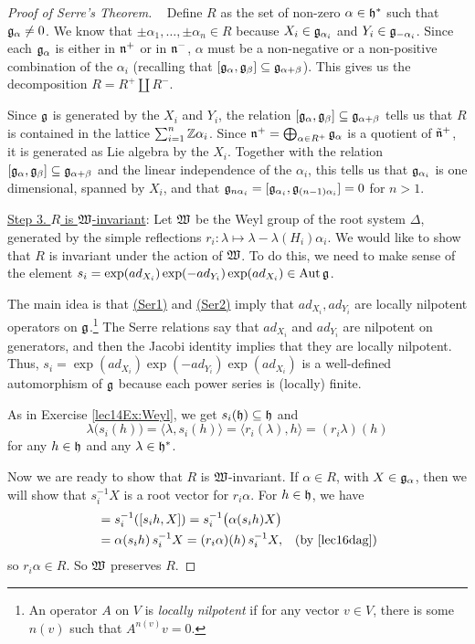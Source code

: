 \begin{proof}[Proof of Serre's Theorem]{\ }
  Define $R$ as the set of non-zero $\alpha\in \mathfrak{h}^*$ such that $\mathfrak{g}_\alpha\neq 0$. We
  know that $\pm \alpha_1,\dots,\pm \alpha_n\in R$ because $X_i\in \mathfrak{g}_{\alpha_i}$ and
  $Y_i\in \mathfrak{g}_{-\alpha_i}$. Since each $\mathfrak{g}_\alpha$ is either in $\mathfrak{n}^+$ or in $\mathfrak{n}^-$,
  $\alpha$ must be a non-negative or a non-positive combination of the $\alpha_i$
  (recalling that $[\mathfrak{g}_\alpha,\mathfrak{g}_\beta]\subseteq \mathfrak{g}_{\alpha+\beta}$). This gives us
  the decomposition $R = R^+\amalg R^-$.

  Since $\mathfrak{g}$ is generated by the $X_i$ and $Y_i$, the relation
  $[\mathfrak{g}_\alpha,\mathfrak{g}_\beta]\subseteq \mathfrak{g}_{\alpha+\beta}$ tells us that $R$ is contained in
  the lattice $\sum_{i=1}^n \mathbb{Z}\alpha_i$. Since $\mathfrak{n}^+=\bigoplus_{\alpha\in
  R^+}\mathfrak{g}_\alpha$ is a quotient of $\tilde{\mathfrak{n}}^+$, it is generated as Lie algebra by the
  $X_i$. Together with the relation $[\mathfrak{g}_\alpha,\mathfrak{g}_{\beta}]\subseteq
  \mathfrak{g}_{\alpha+\beta}$ and the linear independence of the $\alpha_i$, this tells us that
  $\mathfrak{g}_{\alpha_i}$ is one dimensional, spanned by $X_i$, and that
  $\mathfrak{g}_{n\alpha_i}=[\mathfrak{g}_{\alpha_i},\mathfrak{g}_{(n-1)\alpha_i}]=0$ for $n>1$.

 \underline{Step 3. $R$ is $\mathfrak{W}$-invariant}: Let $\mathfrak{W}$ be the Weyl group of the
 root system $\Delta$, generated by the simple reflections $r_i:\lambda\mapsto
 \lambda-\lambda(H_i)\alpha_i$. We would like to show that $R$ is invariant under the
 action of $\mathfrak{W}$. To do this, we need to make sense of the element $s_i =
 \exp(ad_{X_i})\exp(-ad_{Y_i})\exp(ad_{X_i})\in \operatorname{Aut} \mathfrak{g}$.

 The main idea is that \hyperlink{Serre}{(Ser1)} and
 \hyperlink{Serre}{(Ser2)} imply that $ad_{X_i},ad_{Y_i}$ are locally nilpotent
 operators on $\mathfrak{g}$.\footnote{An operator $A$ on $V$ is \emph{locally nilpotent} if for
 any vector $v\in V$, there is some $n(v)$ such that $A^{n(v)}v=0$.} The Serre
 relations say that $ad_{X_i}$ and $ad_{Y_i}$ are nilpotent on generators, and then
 the Jacobi identity implies that they are locally nilpotent. Thus,
 $s_i=\exp(ad_{X_i})\exp(-ad_{Y_i})\exp(ad_{X_i})$ is a well-defined automorphism of
 $\mathfrak{g}$ because each power series is (locally) finite.

 As in Exercise \ref{lec14Ex:Weyl}, we get $s_i(\mathfrak{h})\subseteq \mathfrak{h}$ and
 \begin{equation}\label{lec16dag}
  \lambda\bigl( s_i(h)\bigr) = \langle \lambda, s_i(h) \rangle =\langle r_i(\lambda),h\rangle
  = (r_i \lambda)(h)
 \end{equation}
 for any $h\in \mathfrak{h}$ and any $\lambda\in \mathfrak{h}^*$.

 Now we are ready to show that $R$ is $\mathfrak{W}$-invariant. If $\alpha\in R$, with $X\in
 \mathfrak{g}_\alpha$, then we will show that $s_i^{-1}X$ is a root vector for $r_i\alpha$. For
 $h\in \mathfrak{h}$, we have
 \begin{align*}
   [h,s_i^{-1}X] &= s_i^{-1}([s_i h,X]) = s_i^{-1}\bigl( \alpha(s_i h)X\bigr) \\
        &= \alpha(s_ih)\,s_i^{-1}X = (r_i\alpha)(h)\,s_i^{-1}X, &\text{(by \ref{lec16dag})}
 \end{align*}
 so $r_i\alpha\in R$. So $\mathfrak{W}$ preserves $R$.


\end{proof}
